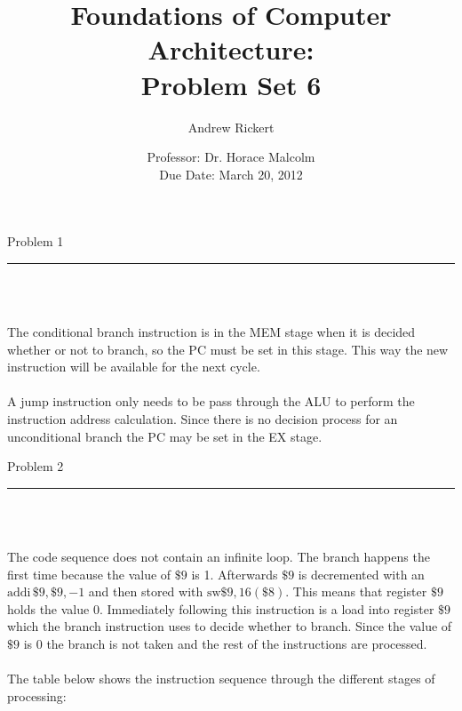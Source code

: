 \documentclass[11pt,reqno]{article}
\title{Foundations of Computer Architecture: \\ Problem Set 6 }
\author{Andrew Rickert}
\date{Professor: Dr. Horace Malcolm \\ \hspace{-33pt} Due Date: March 20,  2012}                                           %
\begin{document}
\maketitle


\begin{flushleft} 
Problem 1 \\
\rule{500pt}{1pt}\\
\end{flushleft} 


\noindent{}\\ 

The conditional branch instruction is in the MEM stage when it is decided whether or not to branch, so the PC must be set in this stage. This way the new instruction will be available for the next cycle.\\

\noindent{}\\ 

A jump instruction only needs to be pass through the ALU to perform the instruction address calculation. Since there is no decision process for an unconditional branch the PC may be set in the EX stage.
\newpage

\begin{flushleft} 
Problem 2 \\
\rule{500pt}{1pt}\\
\end{flushleft} 


\noindent{}\\ 

The code sequence does not contain an infinite loop. The branch happens the first time because the value of $\$9$ is 1. Afterwards $\$9$ is decremented with an $\text{addi}\, \$9,\$9,-1$ and then stored with $\text{sw} \$9,16(\$8)$. This means that register $\$9$ holds the value 0. Immediately following this instruction is a load into register $\$9$ which the branch instruction uses to decide whether to branch. Since the value of $\$9$ is 0 the branch is not taken and the rest of the instructions are processed.\\

\noindent{}\\ 

\noindent The table below shows the instruction sequence through the different stages of processing:\\
\end{document}
